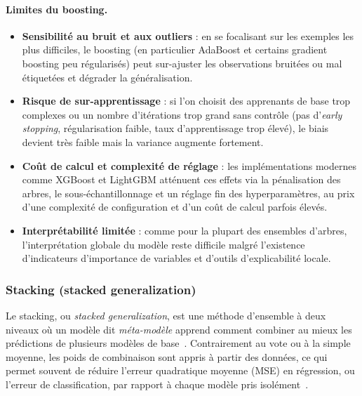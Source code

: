 \paragraph{Limites du boosting.}
\begin{itemize}
  \item \textbf{Sensibilité au bruit et aux outliers} : en se focalisant sur les exemples les plus
  difficiles, le boosting (en particulier AdaBoost et certains gradient boosting peu régularisés)
  peut sur-ajuster les observations bruitées ou mal étiquetées et dégrader la généralisation.
  \item \textbf{Risque de sur-apprentissage} : si l'on choisit des apprenants de base trop complexes
  ou un nombre d'itérations trop grand sans contrôle (pas d'\emph{early stopping}, régularisation
  faible, taux d'apprentissage trop élevé), le biais devient très faible mais la variance augmente
  fortement.
  \item \textbf{Coût de calcul et complexité de réglage} : les implémentations modernes comme
  XGBoost et LightGBM atténuent ces effets via la pénalisation des arbres, le sous-échantillonnage
  et un réglage fin des hyperparamètres, au prix d'une complexité de configuration et d'un coût
  de calcul parfois élevés.
  \item \textbf{Interprétabilité limitée} : comme pour la plupart des ensembles d'arbres, l'interprétation
  globale du modèle reste difficile malgré l'existence d'indicateurs d'importance de variables et
  d'outils d'explicabilité locale.
\end{itemize}

\subsubsection{Stacking (stacked generalization)}

Le stacking, ou \emph{stacked generalization}, est une méthode d'ensemble à deux niveaux où un
modèle dit \emph{méta-modèle} apprend comment combiner au mieux les prédictions de plusieurs
modèles de base~\cite{wolpert_stacked_1992,ting_witten_stacking_1999}. Contrairement au vote
ou à la simple moyenne, les poids de combinaison sont appris à partir des données, ce qui permet
souvent de réduire l'erreur quadratique moyenne (MSE) en régression, ou l'erreur de classification,
par rapport à chaque modèle pris isolément~\cite{breiman_stacked_regressions_1996}.

